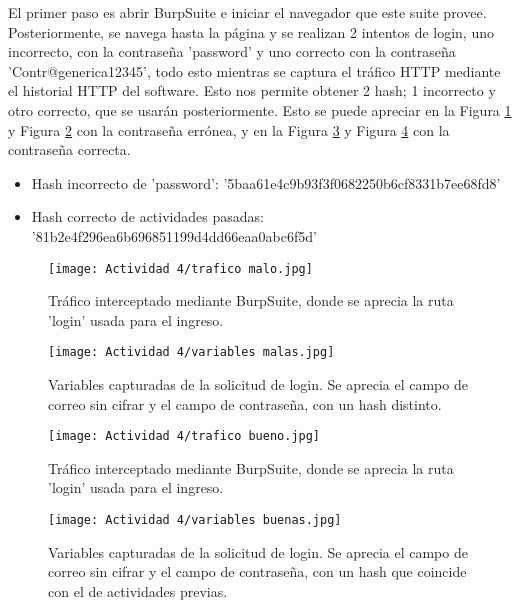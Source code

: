 \documentclass[letter,12pt]{article}
\begin{document}
El primer paso es abrir BurpSuite e iniciar el navegador que este suite provee. Posteriormente, se navega hasta la página y se realizan 2 intentos de login, uno incorrecto, con la contraseña 'password' y uno correcto con la contraseña 'Contr@generica12345', todo esto mientras se captura el tráfico HTTP mediante el historial HTTP del software. Esto nos permite obtener 2 hash; 1 incorrecto y otro correcto, que se usarán posteriormente. Esto se puede apreciar en la Figura \ref{fig: trafico malo} y Figura \ref{fig:variables malas} con la contraseña errónea, y en la Figura \ref{fig:trafico bueno} y Figura \ref{fig:variables buenas} con la contraseña correcta.

\begin{itemize}
    \item Hash incorrecto de 'password': '5baa61e4c9b93f3f0682250b6cf8331b7ee68fd8'
    \item Hash correcto de actividades pasadas: '81b2e4f296ea6b696851199d4dd66eaa0abc6f5d'
\end{itemize}

\begin{figure}[H]
    \centering
    \texttt{[image: Actividad 4/trafico malo.jpg]}
    \caption{Tráfico interceptado mediante BurpSuite, donde se aprecia la ruta 'login' usada para el ingreso.}
    \label{fig: trafico malo}
\end{figure}

\begin{figure}[H]
    \centering
    \texttt{[image: Actividad 4/variables malas.jpg]}
    \caption{Variables capturadas de la solicitud de login. Se aprecia el campo de correo sin cifrar y el campo de contraseña, con un hash distinto.}
    \label{fig:variables malas}
\end{figure}
\begin{figure}[H]
    \centering
    \texttt{[image: Actividad 4/trafico bueno.jpg]}
    \caption{Tráfico interceptado mediante BurpSuite, donde se aprecia la ruta 'login' usada para el ingreso.}
    \label{fig:trafico bueno}
\end{figure}

\begin{figure}[H]
    \centering
    \texttt{[image: Actividad 4/variables buenas.jpg]}
    \caption{Variables capturadas de la solicitud de login. Se aprecia el campo de correo sin cifrar y el campo de contraseña, con un hash que coincide con el de actividades previas.}
    \label{fig:variables buenas}
\end{figure}
\end{document}

